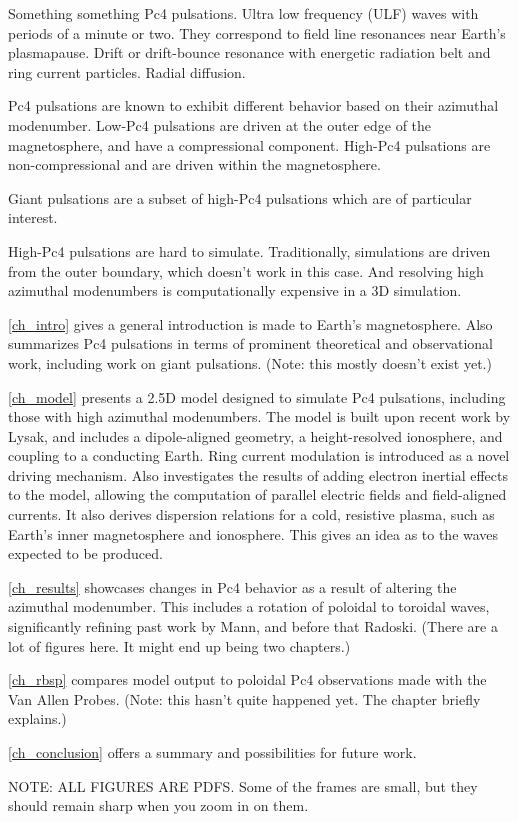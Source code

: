 
Something something Pc4 pulsations. Ultra low frequency (ULF) waves with periods of a minute or two. They correspond to field line resonances near Earth's plasmapause. Drift or drift-bounce resonance with energetic radiation belt and ring current particles. Radial diffusion. 

Pc4 pulsations are known to exhibit different behavior based on their azimuthal modenumber. Low-\azm Pc4 pulsations are driven at the outer edge of the magnetosphere, and have a compressional component. High-\azm Pc4 pulsations are non-compressional and are driven within the magnetosphere. 

Giant pulsations are a subset of high-\azm Pc4 pulsations which are of particular interest. 

High-\azm Pc4 pulsations are hard to simulate. Traditionally, simulations are driven from the outer boundary, which doesn't work in this case. And resolving high azimuthal modenumbers is computationally expensive in a 3D simulation. 

\cref{ch_intro} gives a general introduction is made to Earth's magnetosphere. Also summarizes Pc4 pulsations in terms of prominent theoretical and observational work, including work on giant pulsations. (Note: this mostly doesn't exist yet.) 

\cref{ch_model} presents a 2.5D model designed to simulate Pc4 pulsations, including those with high azimuthal modenumbers. The model is built upon recent work by Lysak, and includes a dipole-aligned geometry, a height-resolved ionosphere, and coupling to a conducting Earth. Ring current modulation is introduced as a novel driving mechanism. Also investigates the results of adding electron inertial effects to the model, allowing the computation of parallel electric fields and field-aligned currents. It also derives dispersion relations for a cold, resistive plasma, such as Earth's inner magnetosphere and ionosphere. This gives an idea as to the waves expected to be produced. 

\cref{ch_results} showcases changes in Pc4 behavior as a result of altering the azimuthal modenumber. This includes a rotation of poloidal to toroidal waves, significantly refining past work by Mann, and before that Radoski. (There are a lot of figures here. It might end up being two chapters.)

\cref{ch_rbsp} compares model output to poloidal Pc4 observations made with the Van Allen Probes. (Note: this hasn't quite happened yet. The chapter briefly explains.)

\cref{ch_conclusion} offers a summary and possibilities for future work. 

NOTE: ALL FIGURES ARE PDFS. Some of the frames are small, but they should remain sharp when you zoom in on them. 


